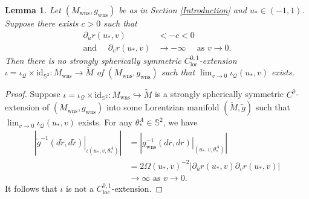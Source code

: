 \documentclass{article}
\newcommand{\Q}{\mathcal{Q}}
\newcommand{\loc}{\mathrm{loc}}
\newcommand{\Sp}{\mathbb{S}}
\newcommand{\id}{\mathrm{id}}
\newcommand{\Mw}{M_{\mathrm{wns}}}
\newcommand{\gw}{g_{\mathrm{wns}}}
\newtheorem{lemma}[definition]{Lemma}
\begin{document}
\begin{lemma}\label{lemma:SSSLip}
Let $(\Mw,\gw)$ be as in Section \ref{Introduction} and $u_*\in(-1,1)$. Suppose there exists $c>0$ such that
\begin{equation}\label{eqn:blowupassumptionLip}
    \begin{split}
      \partial_ur(u_*,v)&<-c<0\\
       \text{and }\quad        \partial_vr(u_*,v)&\to-\infty \quad \text{ as }v\to0.
    \end{split}
\end{equation}
Then there is no strongly spherically symmetric $C^{0,1}_{\loc}$-extension $\iota=\iota_{\Q}\times {\id}_{\Sp^2}:\Mw\to\tilde{M}$ of $(\Mw,\gw)$ such that $\lim_{v\to0}\iota_{\Q}(u_*,v)$ exists.
\end{lemma}
\begin{proof} 
    Suppose $\iota=\iota_{\Q}\times \text{id}_{\Sp^2}:\Mw\hookrightarrow\tilde{M}$ is a strongly spherically symmetric $C^0$-extension of $(\Mw,\gw)$ into some Lorentzian manifold $(\tilde{M},\tilde{g})$ such that $\lim_{v\to0}\iota_{\Q}(u_*,v)$ exists. For any $\theta_*^A\in\Sp^2$, we have
    \begin{equation}
        \begin{split}
           \left|\left.\tilde{g}^{-1}(d\tilde{r},d\tilde{r})\right\vert_{\iota(u_*,v,\theta^A_*)}\right|
           &=\left|\left.\gw^{-1}(dr,dr)\right\vert_{(u_*,v,\theta^A_*)}\right|\\
            &=2\Omega(u_*,v)^{-2}\left|\partial_ur(u_*,v)\partial_vr(u_*,v)\right|\\
            &\to\infty\text{ as }v\to0.
        \end{split}
    \end{equation}
It follows that $\iota$ is not a $C^{0,1}_{\loc}$-extension.
\end{proof}
\end{document}
